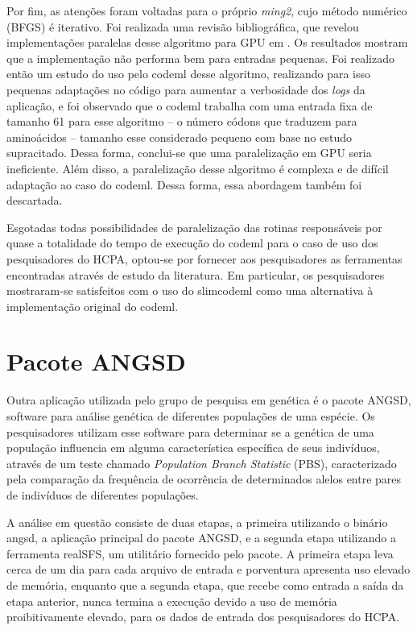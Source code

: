 \documentclass[cic,tc]{iiufrgs}
\begin{document}
Por fim, as atenções foram voltadas para o próprio \textit{ming2}, cujo método
numérico (BFGS) é iterativo. Foi realizada uma revisão bibliográfica, que
revelou implementações paralelas desse algoritmo para GPU em
\cite{fei2014parallel}. Os resultados mostram que a implementação não
performa bem para entradas pequenas. Foi realizado então um estudo do uso pelo
codeml desse algoritmo, realizando para isso pequenas adaptações no código para
aumentar a verbosidade dos \textit{logs} da aplicação, e foi observado que o
codeml trabalha com uma entrada fixa de tamanho 61 para esse algoritmo -- o
número códons que traduzem para aminoácidos -- tamanho esse considerado pequeno
com base no estudo supracitado. Dessa forma, conclui-se que uma paralelização
em GPU seria ineficiente. Além disso, a paralelização desse algoritmo é
complexa e de difícil adaptação ao caso do codeml. Dessa forma, essa abordagem
também foi descartada.

Esgotadas todas possibilidades de paralelização das rotinas responsáveis por
quase a totalidade do tempo de execução do codeml para o caso de uso dos
pesquisadores do HCPA, optou-se por fornecer aos pesquisadores as ferramentas
encontradas através de estudo da literatura. Em particular, os pesquisadores
mostraram-se satisfeitos com o uso do slimcodeml como uma alternativa à
implementação original do codeml.

\chapter{Pacote ANGSD}
\label{sec:angsd}

Outra aplicação utilizada pelo grupo de pesquisa em genética é o pacote ANGSD,
software para análise genética de diferentes populações de uma
espécie.\cite{korneliussen2014angsd} Os pesquisadores utilizam esse software
para determinar se a genética de uma população influencia em alguma
característica específica de seus indivíduos, através de um teste chamado
\textit{Population Branch Statistic} (PBS), caracterizado pela comparação da
frequência de ocorrência de determinados alelos entre pares de
indivíduos de diferentes populações.\cite{yi2010sequencing}

A análise em questão consiste de duas etapas, a primeira utilizando o binário
angsd, a aplicação principal do pacote ANGSD, e a segunda etapa utilizando a
ferramenta realSFS, um utilitário fornecido pelo pacote. A primeira etapa leva
cerca de um dia para cada arquivo de entrada e porventura apresenta uso elevado
de memória, enquanto que a segunda etapa, que recebe como entrada a saída da
etapa anterior, nunca termina a execução devido a uso de memória
proibitivamente elevado, para os dados de entrada dos pesquisadores do HCPA.
\end{document}

